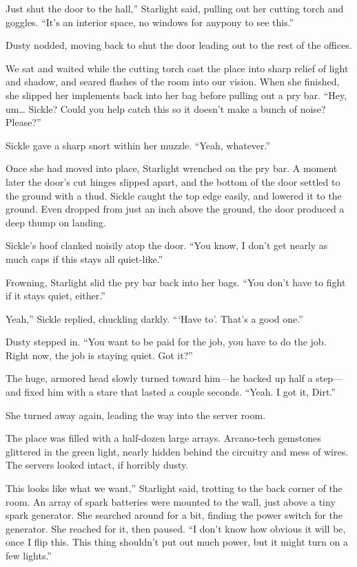 \leavevmode{}Just shut the door to the hall,” Starlight said, pulling out her cutting torch and goggles. “It’s an interior space, no windows for anypony to see this.”

Dusty nodded, moving back to shut the door leading out to the rest of the offices.

We sat and waited while the cutting torch cast the place into sharp relief of light and shadow, and seared flashes of the room into our vision. When she finished, she slipped her implements back into her bag before pulling out a pry bar. “Hey, um… Sickle? Could you help catch this so it doesn’t make a bunch of noise? Please?”

Sickle gave a sharp snort within her muzzle. “Yeah, whatever.”

Once she had moved into place, Starlight wrenched on the pry bar. A moment later the door’s cut hinges slipped apart, and the bottom of the door settled to the ground with a thud. Sickle caught the top edge easily, and lowered it to the ground. Even dropped from just an inch above the ground, the door produced a deep thump on landing.

Sickle’s hoof clanked noisily atop the door. “You know, I don’t get nearly as much caps if this stays all quiet-like.”

Frowning, Starlight slid the pry bar back into her bags. “You don’t have to fight if it stays quiet, either.”

\leavevmode{}Yeah,” Sickle replied, chuckling darkly. “‘Have to’. That’s a good one.”

Dusty stepped in. “You want to be paid for the job, you have to do the job. Right now, the job is staying quiet. Got it?”

The huge, armored head slowly turned toward him—he backed up half a step—and fixed him with a stare that lasted a couple seconds. “Yeah. I got it, Dirt.”

She turned away again, leading the way into the server room.

The place was filled with a half-dozen large arrays. Arcano-tech gemstones glittered in the green light, nearly hidden behind the circuitry and mess of wires. The servers looked intact, if horribly dusty.

\leavevmode{}This looks like what we want,” Starlight said, trotting to the back corner of the room. An array of spark batteries were mounted to the wall, just above a tiny spark generator. She searched around for a bit, finding the power switch for the generator. She reached for it, then paused. “I don’t know how obvious it will be, once I flip this. This thing shouldn’t put out much power, but it might turn on a few lights.”


